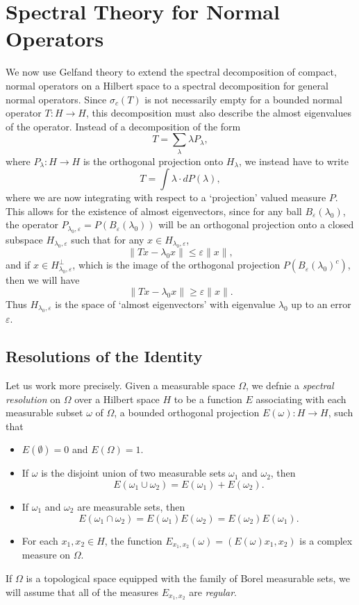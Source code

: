 \chapter{Spectral Theory for Normal Operators}

We now use Gelfand theory to extend the spectral decomposition of compact, normal operators on a Hilbert space to a spectral decomposition for general normal operators. Since $\sigma_c(T)$ is not necessarily empty for a bounded normal operator $T: H \to H$, this decomposition must also describe the almost eigenvalues of the operator. Instead of a decomposition of the form
%
\[ T = \sum_\lambda \lambda P_\lambda, \]
%
where $P_\lambda: H \to H$ is the orthogonal projection onto $H_\lambda$, we instead have to write
%
\[ T = \int \lambda \cdot dP(\lambda), \]
%
where we are now integrating with respect to a `projection' valued measure $P$. This allows for the existence of almost eigenvectors, since for any ball $B_\varepsilon(\lambda_0)$, the operator $P_{\lambda_0,\varepsilon} = P(B_\varepsilon(\lambda_0))$ will be an orthogonal projection onto a closed subspace $H_{\lambda_0,\varepsilon}$ such that for any $x \in H_{\lambda_0,\varepsilon}$,
%
\[ \| Tx - \lambda_0 x \| \leq \varepsilon \| x \|, \]
%
and if $x \in H_{\lambda_0,\varepsilon}^\perp$, which is the image of the orthogonal projection $P(B_\varepsilon(\lambda_0)^c)$, then we will have
%
\[ \| Tx - \lambda_0 x \| \geq \varepsilon \| x \|. \]
%
Thus $H_{\lambda_0,\varepsilon}$ is the space of `almost eigenvectors' with eigenvalue $\lambda_0$ up to an error $\varepsilon$.

\section{Resolutions of the Identity}

Let us work more precisely. Given a measurable space $\Omega$, we defnie a \emph{spectral resolution} on $\Omega$ over a Hilbert space $H$ to be a function $E$ associating with each measurable subset $\omega$ of $\Omega$, a bounded orthogonal projection $E(\omega): H \to H$, such that
%
\begin{itemize}
    \item $E(\emptyset) = 0$ and $E(\Omega) = 1$.
    \item If $\omega$ is the disjoint union of two measurable sets $\omega_1$ and $\omega_2$, then
    \[ E(\omega_1 \cup \omega_2) = E(\omega_1) + E(\omega_2). \]

    \item If $\omega_1$ and $\omega_2$ are measurable sets, then
    \[ E(\omega_1 \cap \omega_2) = E(\omega_1) E(\omega_2) = E(\omega_2) E(\omega_1). \]

    \item For each $x_1,x_2 \in H$, the function $E_{x_1,x_2}(\omega) = (E(\omega) x_1, x_2)$ is a complex measure on $\Omega$.
\end{itemize}
%
If $\Omega$ is a topological space equipped with the family of Borel measurable sets, we will assume that all of the measures $E_{x_1,x_2}$ are \emph{regular}.

